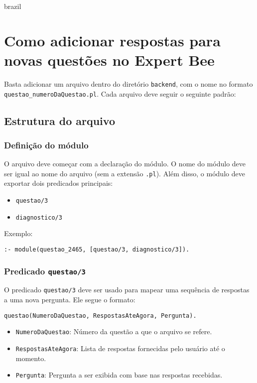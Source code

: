 \begin{otherlanguage*}{brazil}

\chapter{Como adicionar respostas para novas questões no Expert Bee}
\label{manual:adicionar-respostas}

Basta adicionar um arquivo dentro do diretório \texttt{\/backend}, com o nome no formato \texttt{questao\_{numeroDaQuestao}.pl}. Cada arquivo deve seguir o seguinte padrão:

\section{Estrutura do arquivo}

\subsection{Definição do módulo}
O arquivo deve começar com a declaração do módulo. O nome do módulo deve ser igual ao nome do arquivo (sem a extensão \texttt{.pl}). Além disso, o módulo deve exportar dois predicados principais:  
\begin{itemize}
    \item \texttt{questao/3}
    \item \texttt{diagnostico/3}
\end{itemize}

Exemplo:
\begin{verbatim}
:- module(questao_2465, [questao/3, diagnostico/3]).
\end{verbatim}

\subsection{Predicado \texttt{questao/3}}
O predicado \texttt{questao/3} deve ser usado para mapear uma sequência de respostas a uma nova pergunta. Ele segue o formato:
\begin{verbatim}
questao(NumeroDaQuestao, RespostasAteAgora, Pergunta).
\end{verbatim}

\begin{itemize}
    \item \texttt{NumeroDaQuestao}: Número da questão a que o arquivo se refere.
    \item \texttt{RespostasAteAgora}: Lista de respostas fornecidas pelo usuário até o momento.
    \item \texttt{Pergunta}: Pergunta a ser exibida com base nas respostas recebidas.
\end{itemize}


\end{otherlanguage*}

